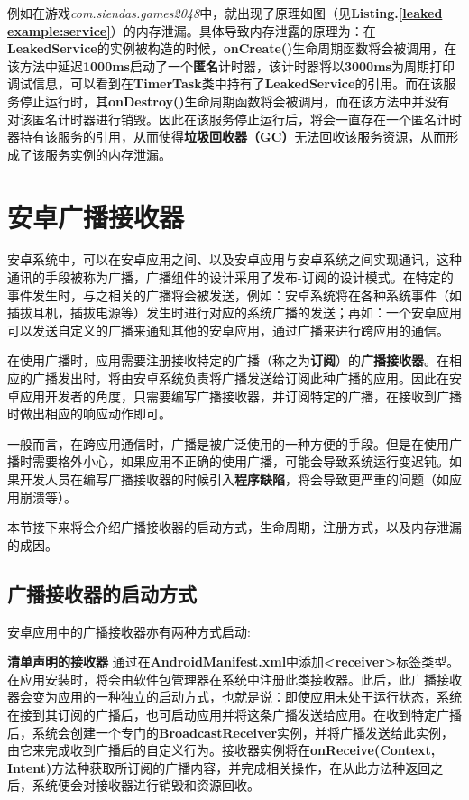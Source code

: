 例如在游戏\emph{com.siendas.games2048}中，就出现了原理如图（见\textbf{Listing.\textcolor{red}{\ref{leaked example:service}}}）的内存泄漏。具体导致内存泄露的原理为：在\textbf{LeakedService}的实例被构造的时候，\textbf{onCreate()}生命周期函数将会被调用，在该方法中延迟\textbf{1000ms}启动了一个\textbf{匿名}计时器，该计时器将以\textbf{3000ms}为周期打印调试信息，可以看到在\textbf{TimerTask}类中持有了\textbf{LeakedService}的引用。而在该服务停止运行时，其\textbf{onDestroy()}生命周期函数将会被调用，而在该方法中并没有对该匿名计时器进行销毁。因此在该服务停止运行后，将会一直存在一个匿名计时器持有该服务的引用，从而使得\textbf{垃圾回收器（GC）}无法回收该服务资源，从而形成了该服务实例的内存泄漏。

\section{安卓广播接收器}\label{broadcast}

安卓系统中，可以在安卓应用之间、以及安卓应用与安卓系统之间实现通讯，这种通讯的手段被称为广播\cite{androidbroadcastsguide}，广播组件的设计采用了发布-订阅的设计模式。在特定的事件发生时，与之相关的广播将会被发送，例如：安卓系统将在各种系统事件（如插拔耳机，插拔电源等）发生时进行对应的系统广播的发送；再如：一个安卓应用可以发送自定义的广播来通知其他的安卓应用，通过广播来进行跨应用的通信。

在使用广播时，应用需要注册接收特定的广播（称之为\textbf{订阅}）的\textbf{广播接收器}。在相应的广播发出时，将由安卓系统负责将广播发送给订阅此种广播的应用。因此在安卓应用开发者的角度，只需要编写广播接收器，并订阅特定的广播，在接收到广播时做出相应的响应动作即可。
	
一般而言，在跨应用通信时，广播是被广泛使用的一种方便的手段。但是在使用广播时需要格外小心，如果应用不正确的使用广播，可能会导致系统运行变迟钝。如果开发人员在编写广播接收器的时候引入\textbf{程序缺陷}，将会导致更严重的问题（如应用崩溃等）。

本节接下来将会介绍广播接收器的启动方式，生命周期，注册方式，以及内存泄漏的成因。

\subsection{广播接收器的启动方式}
安卓应用中的广播接收器亦有两种方式启动\cite{broadcast}:

\textbf{清单声明的接收器 }\label{declaration:receiver in manifest} 通过在\textbf{AndroidManifest.xml}中添加\textbf{<receiver>}标签类型。在应用安装时，将会由软件包管理器在系统中注册此类接收器。此后，此广播接收器会变为应用的一种独立的启动方式，也就是说：即使应用未处于运行状态，系统在接到其订阅的广播后，也可启动应用并将这条广播发送给应用。在收到特定广播后，系统会创建一个专门的\textbf{BroadcastReceiver}实例，并将广播发送给此实例，由它来完成收到广播后的自定义行为。接收器实例将在\textbf{onReceive(Context, Intent)}方法种获取所订阅的广播内容，并完成相关操作，在从此方法种返回之后，系统便会对接收器进行销毁和资源回收。

